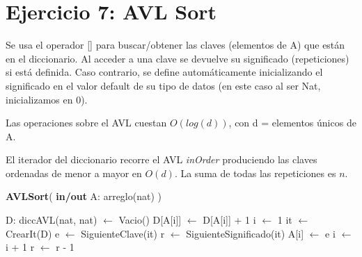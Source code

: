 \section{Ejercicio 7: AVL Sort}

Se usa el operador [] para buscar/obtener las claves (elementos de A) que están en el diccionario. Al acceder a una clave se devuelve su significado (repeticiones) si está definida. Caso contrario, se define automáticamente inicializando el significado en el valor default de su tipo de datos (en este caso al ser Nat, inicializamos en 0).

Las operaciones sobre el AVL cuestan $O(log(d))$, con d = elementos únicos de A.

El iterador del diccionario recorre el AVL \emph{inOrder} produciendo las claves ordenadas de menor a mayor en $O(d)$. La suma de todas las repeticiones es $n$.

\begin{algorithm}[H]
\caption{
    \textbf{AVLSort}(
        \textbf{in/out} A: arreglo(nat)
    )
}
\begin{algorithmic}[1]
    \State D: diccAVL(nat, nat) $\gets$ Vacio() 
     
        \State D[A[i]] $\gets$ D[A[i]] + 1 
    \EndFor
    \State i $\gets$ 1 
    \State it $\gets$ CrearIt(D) 
     
        \State e $\gets$ SiguienteClave(it) 
        \State r $\gets$ SiguienteSignificado(it) 
         
            \State A[i] $\gets$ e 
            \State i $\gets$ i + 1 
            \State r $\gets$ r - 1 
        \EndWhile
    \EndWhile
\end{algorithmic}
\end{algorithm}
